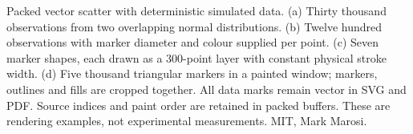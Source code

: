 \caption{Packed vector scatter with deterministic simulated data. (a) Thirty thousand observations from two overlapping normal distributions. (b) Twelve hundred observations with marker diameter and colour supplied per point. (c) Seven marker shapes, each drawn as a 300-point layer with constant physical stroke width. (d) Five thousand triangular markers in a painted window; markers, outlines and fills are cropped together. All data marks remain vector in SVG and PDF. Source indices and paint order are retained in packed buffers. These are rendering examples, not experimental measurements. MIT, Mark Marosi.}
